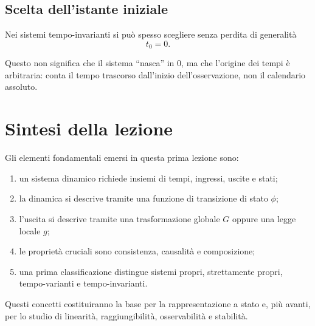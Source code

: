 \subsection{Scelta dell'istante iniziale}

Nei sistemi tempo-invarianti si può spesso scegliere senza perdita di generalità
\[
t_0=0.
\]

Questo non significa che il sistema ``nasca'' in $0$, ma che l'origine dei tempi è arbitraria: conta il tempo trascorso dall'inizio dell'osservazione, non il calendario assoluto.

\section{Sintesi della lezione}

Gli elementi fondamentali emersi in questa prima lezione sono:
\begin{enumerate}
    \item un sistema dinamico richiede insiemi di tempi, ingressi, uscite e stati;
    \item la dinamica si descrive tramite una funzione di transizione di stato $\phi$;
    \item l'uscita si descrive tramite una trasformazione globale $G$ oppure una legge locale $g$;
    \item le proprietà cruciali sono consistenza, causalità e composizione;
    \item una prima classificazione distingue sistemi propri, strettamente propri, tempo-varianti e tempo-invarianti.
\end{enumerate}

Questi concetti costituiranno la base per la rappresentazione a stato e, più avanti, per lo studio di linearità, raggiungibilità, osservabilità e stabilità.